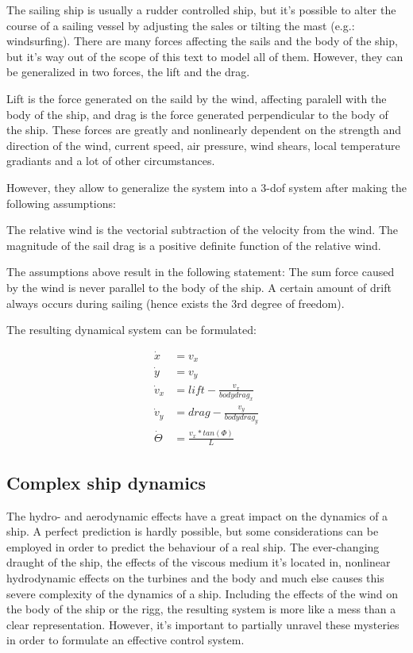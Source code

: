 The sailing ship is usually a rudder controlled ship, but it’s possible to alter the course of a sailing vessel by adjusting the sales or tilting the mast (e.g.: windsurfing).
There are many forces affecting the sails and the body of the ship, but it’s way out of the scope of this text to model all of them. However, they can be generalized in two forces, the lift and the drag.

Lift is the force generated on the saild by the wind, affecting paralell with the body of the ship, and drag is the force generated perpendicular to the body of the ship. These forces are greatly and nonlinearly dependent on the strength and direction of the wind, current speed, air pressure, wind shears, local temperature gradiants and a lot of other circumstances.

However, they allow to generalize the system into a 3-dof system after making the following assumptions:

The relative wind is the vectorial subtraction of the velocity from the wind.
The magnitude of the sail drag is a positive definite function of the relative wind.

The assumptions above result in the following statement:
The sum force caused by the wind is never parallel to the body of the ship. A certain amount of drift always occurs during sailing (hence exists the 3rd degree of freedom).

The resulting dynamical system can be formulated:

\begin{align}
		\dot{x} &= v_x
	\\	\dot{y} &= v_y
	\\	\dot{v}_x &= lift - \frac{v_x}{bodydrag_x}
	\\	\dot{v}_y &= drag - \frac{v_y}{bodydrag_y}
	\\	\dot{\Theta} &= \frac{v_x * tan(\Phi)}{L}
\end{align}

\subsection{Complex ship dynamics}

The hydro- and aerodynamic effects have a great impact on the dynamics of a ship. A perfect prediction is hardly possible, but some considerations can be employed in order to predict the behaviour of a real ship.
The ever-changing draught of the ship, the effects of the viscous medium it’s located in, nonlinear hydrodynamic effects on the turbines and the body and much else causes this severe complexity of the dynamics of a ship. Including the effects of the wind on the body of the ship or the rigg, the resulting system is more like a mess than a clear representation.
However, it’s important to partially unravel these mysteries in order to formulate an effective control system.


